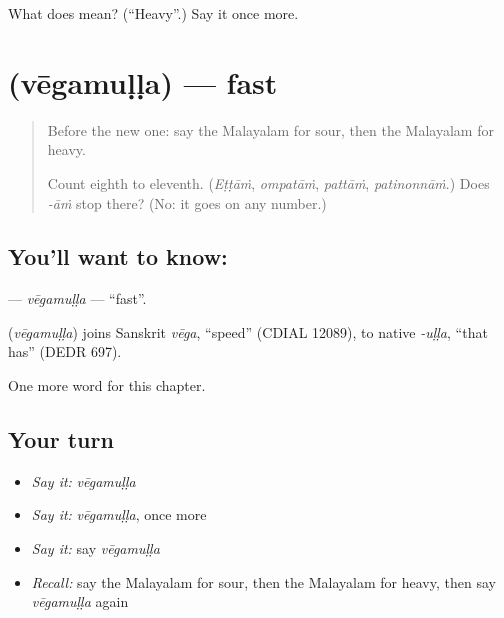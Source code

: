 \begin{tcolorbox}[breakable,colback=teal!4,colframe=teal!35!black,title={Before you move on}]
What does  mean? (\textquotedblleft{}Heavy\textquotedblright{}.) Say it once more.
\end{tcolorbox}
\section[\texorpdfstring{\ml{വേഗമുള്ള} (vēgamuḷḷa)}{വേഗമുള്ള (vēgamuḷḷa)}]{ (vēgamuḷḷa) — fast}

\label{lesson:ML-C166-vegamulla}



\begin{quote}
Before the new one: say the Malayalam for sour, then the Malayalam for heavy.

Count eighth to eleventh. (\emph{Eṭṭāṁ}, \emph{ompatāṁ}, \emph{pattāṁ}, \emph{patinonnāṁ}.) Does \emph{-āṁ} stop there? (No: it goes on any number.)
\end{quote}

\subsection*{You'll want to know: }
\textbf{} — \emph{vēgamuḷḷa} — \textquotedblleft{}fast\textquotedblright{}.

\begin{cousinweb}
\textbf{} (\emph{vēgamuḷḷa}) joins Sanskrit \emph{vēga}, \textquotedblleft{}speed\textquotedblright{} (CDIAL 12089), to native \emph{-uḷḷa}, \textquotedblleft{}that has\textquotedblright{} (DEDR 697).
\end{cousinweb}

\begin{grammarlens}[title={What you've built}]
One more word for this chapter.
\end{grammarlens}

\subsection*{Your turn}
\begin{itemize}
\raggedright
  \item \emph{Say it:} \emph{vēgamuḷḷa}
  \item \emph{Say it:} \emph{vēgamuḷḷa}, once more
  \item \emph{Say it:} say \emph{vēgamuḷḷa}
  \item \emph{Recall:} say the Malayalam for sour, then the Malayalam for heavy, then say \emph{vēgamuḷḷa} again
\end{itemize}

